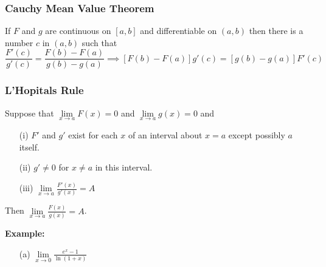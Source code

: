 \documentclass{beamer}
\begin{document}
\begin{frame}
\frametitle{\textbf{Cauchy Mean Value Theorem}}

\begin{theorem}
	If $F$ and $g$ are continuous on $[a,b]$ and differentiable on $(a,b)$ then there is a number $c$ in $(a,b)$ such that
	$$\frac{F'(c)}{g'(c)} = \frac{F(b)-F(a)}{g(b)-g(a)} \implies [F(b)-F(a)]g'(c) = [g(b)-g(a)]F'(c)$$
\end{theorem}
\end{frame}


\begin{frame}
\frametitle{\textbf{L'Hopitals Rule}}
\begin{theorem}
	Suppose that $\lim\limits_{x \to a} F(x)=0$ and $\lim\limits_{x \to a} g(x)=0$ and
	\begin{itemize}
		\item[(i)] $F'$ and $g'$ exist for each $x$ of an interval about $x=a$ except possibly $a$ itself.
		\item[(ii)] $g'\neq0$ for $x\neq a$ in this interval.
		\item[(iii)] $\lim\limits_{x \to a} \frac{F'(x)}{g'(x)}=A$
	\end{itemize}
Then $\lim\limits_{x \to a} \frac{F(x)}{g(x)}=A$.
\end{theorem}
\vspace{6pt}
\textbf{Example:}
\begin{itemize}
	\item[(a)] $\lim\limits_{x\to 0} \frac{e^x-1}{\ln(1+x)}$
\end{itemize}
\end{frame}
\end{document}
